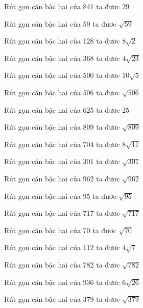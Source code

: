 \documentclass[12pt,a4paper]{article}
\begin{document}
\begin{ex}
Rút gọn căn bậc hai của 841 ta đươc $29$
\end{ex}
\begin{ex}
Rút gọn căn bậc hai của 59 ta đươc $\sqrt{59}$
\end{ex}
\begin{ex}
Rút gọn căn bậc hai của 128 ta đươc $8\sqrt{2}$
\end{ex}
\begin{ex}
Rút gọn căn bậc hai của 368 ta đươc $4\sqrt{23}$
\end{ex}
\begin{ex}
Rút gọn căn bậc hai của 500 ta đươc $10\sqrt{5}$
\end{ex}
\begin{ex}
Rút gọn căn bậc hai của 506 ta đươc $\sqrt{506}$
\end{ex}
\begin{ex}
Rút gọn căn bậc hai của 625 ta đươc $25$
\end{ex}
\begin{ex}
Rút gọn căn bậc hai của 809 ta đươc $\sqrt{809}$
\end{ex}
\begin{ex}
Rút gọn căn bậc hai của 704 ta đươc $8\sqrt{11}$
\end{ex}
\begin{ex}
Rút gọn căn bậc hai của 301 ta đươc $\sqrt{301}$
\end{ex}
\begin{ex}
Rút gọn căn bậc hai của 962 ta đươc $\sqrt{962}$
\end{ex}
\begin{ex}
Rút gọn căn bậc hai của 95 ta đươc $\sqrt{95}$
\end{ex}
\begin{ex}
Rút gọn căn bậc hai của 717 ta đươc $\sqrt{717}$
\end{ex}
\begin{ex}
Rút gọn căn bậc hai của 70 ta đươc $\sqrt{70}$
\end{ex}
\begin{ex}
Rút gọn căn bậc hai của 112 ta đươc $4\sqrt{7}$
\end{ex}
\begin{ex}
Rút gọn căn bậc hai của 782 ta đươc $\sqrt{782}$
\end{ex}
\begin{ex}
Rút gọn căn bậc hai của 936 ta đươc $6\sqrt{26}$
\end{ex}
\begin{ex}
Rút gọn căn bậc hai của 379 ta đươc $\sqrt{379}$
\end{ex}
\end{document}
